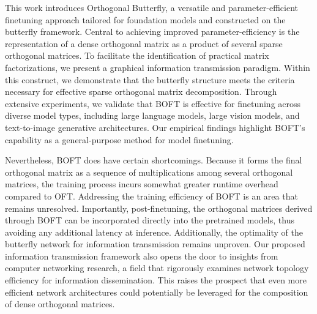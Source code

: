 This work introduces Orthogonal Butterfly, a versatile and parameter-efficient finetuning approach tailored for foundation models and constructed on the butterfly framework. Central to achieving improved parameter-efficiency is the representation of a dense orthogonal matrix as a product of several sparse orthogonal matrices. To facilitate the identification of practical matrix factorizations, we present a graphical information transmission paradigm. Within this construct, we demonstrate that the butterfly structure meets the criteria necessary for effective sparse orthogonal matrix decomposition. Through extensive experiments, we validate that BOFT is effective for finetuning across diverse model types, including large language models, large vision models, and text-to-image generative architectures. Our empirical findings highlight BOFT's capability as a general-purpose method for model finetuning.

Nevertheless, BOFT does have certain shortcomings. Because it forms the final orthogonal matrix as a sequence of multiplications among several orthogonal matrices, the training process incurs somewhat greater runtime overhead compared to OFT. Addressing the training efficiency of BOFT is an area that remains unresolved. Importantly, post-finetuning, the orthogonal matrices derived through BOFT can be incorporated directly into the pretrained models, thus avoiding any additional latency at inference. Additionally, the optimality of the butterfly network for information transmission remains unproven. Our proposed information transmission framework also opens the door to insights from computer networking research, a field that rigorously examines network topology efficiency for information dissemination. This raises the prospect that even more efficient network architectures could potentially be leveraged for the composition of dense orthogonal matrices.